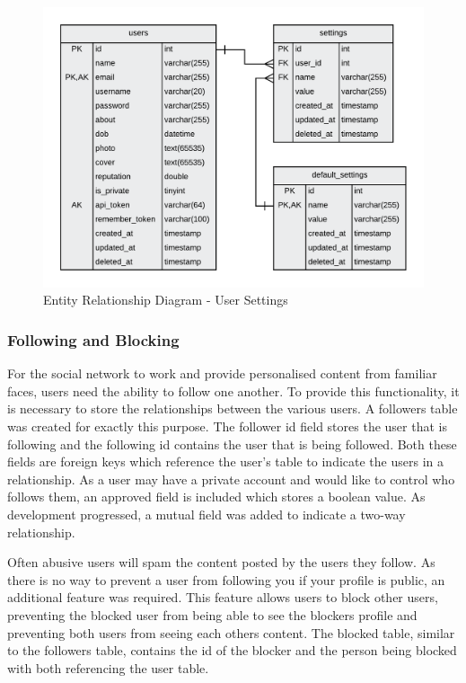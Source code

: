 \begin{figure}[H]
  \centering
  \includegraphics[width=1.0\textwidth]{Images/Design/Database/Settings}
  \caption{Entity Relationship Diagram - User Settings} \label{fig:ERD_Settings}
\end{figure}

\subsubsection{Following and Blocking}

For the social network to work and provide personalised content from familiar faces, users need the ability to follow one another. To provide this functionality, it is necessary to store the relationships between the various users. A followers table was created for exactly this purpose. The follower id field stores the user that is following and the following id contains the user that is being followed. Both these fields are foreign keys which reference the user's table to indicate the users in a relationship. As a user may have a private account and would like to control who follows them, an approved field is included which stores a boolean value. As development progressed, a mutual field was added to indicate a two-way relationship.

Often abusive users will spam the content posted by the users they follow. As there is no way to prevent a user from following you if your profile is public, an additional feature was required. This feature allows users to block other users, preventing the blocked user from being able to see the blockers profile and preventing both users from seeing each others content. The blocked table, similar to the followers table, contains the id of the blocker and the person being blocked with both referencing the user table.

